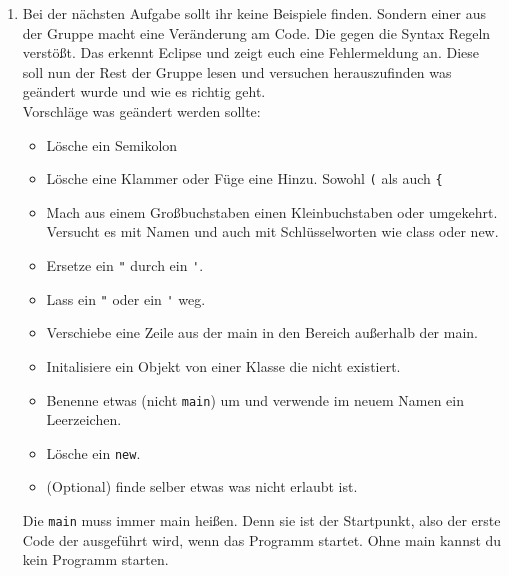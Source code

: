 \begin{enumerate}
    
    \item Bei der nächsten Aufgabe sollt ihr keine Beispiele finden. Sondern einer aus der Gruppe macht eine Veränderung am Code. Die gegen die Syntax Regeln verstößt. Das erkennt Eclipse und zeigt euch eine Fehlermeldung an. Diese soll nun der Rest der Gruppe lesen und versuchen herauszufinden was geändert wurde und wie es richtig geht.\\
          Vorschläge was geändert werden sollte:
          \begin{itemize}
              \item Lösche ein Semikolon
              \item Lösche eine Klammer oder Füge eine Hinzu. Sowohl \lstinline{(} als auch \lstinline{{}
              \item Mach aus einem Großbuchstaben einen Kleinbuchstaben oder umgekehrt. Versucht es mit Namen und auch mit Schlüsselworten wie class oder new.
              \item Ersetze ein \lstinline{"} durch ein \lstinline{'}.
              \item Lass ein \lstinline{"} oder ein \lstinline{'} weg.
              \item Verschiebe eine Zeile aus der main in den Bereich außerhalb der main.
              \item Initalisiere ein Objekt von einer Klasse die nicht existiert.
              \item Benenne etwas (nicht \lstinline{main}) um und verwende im neuem Namen ein Leerzeichen.
              \item Lösche ein \lstinline{new}.
              \item (Optional) finde selber etwas was nicht erlaubt ist.
          \end{itemize}
          \begin{Infobox}[main]
              Die \lstinline{main} muss immer main heißen. Denn sie ist der Startpunkt, also der erste Code der ausgeführt wird, wenn das Programm startet. Ohne main kannst du kein Programm starten.
          \end{Infobox}
\end{enumerate}
